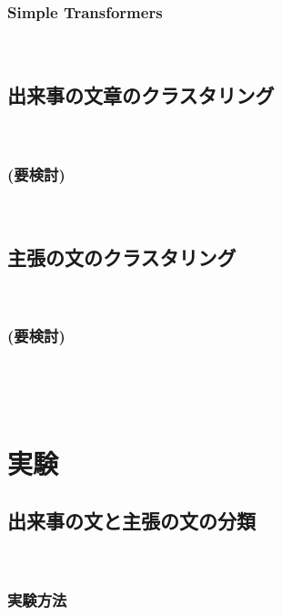 \documentclass[12pt,a4j]{jreport}
\begin{document}
\subsection{Simple Transformers}
~

\section{出来事の文章のクラスタリング}
~

\subsection{(要検討)}
~

\section{主張の文のクラスタリング}
~

\subsection{(要検討)}
~


~%


\chapter{実験}


\section{出来事の文と主張の文の分類}
~

\subsection{実験方法}
~
\end{document}
